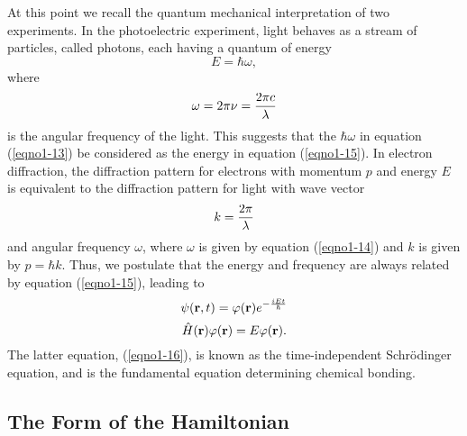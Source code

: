At this point we recall the quantum mechanical interpretation of two 
experiments. In the photoelectric experiment, light behaves as a stream 
of particles, called photons, each having a quantum of energy
\begin{equation}
E = \hbar \omega , 
\label{eqno1-15}
\end{equation}
where
\begin{equation}
\omega = 2 \pi \nu = {2 \pi c \over \lambda}
\end{equation}
is the angular frequency of the light. This suggests that the $\hbar
\omega$ in equation (\ref{eqno1-13}) be considered as the energy in
equation (\ref{eqno1-15}). In electron diffraction, the diffraction
pattern for electrons with momentum $p$ and energy $E$ is equivalent
to the diffraction pattern for light with wave vector
\begin{equation}
k = {2 \pi \over \lambda}
\end{equation}
and angular frequency $\omega$, where $\omega$ is given by equation
(\ref{eqno1-14}) and $k$ is given by $p = \hbar k$.  Thus, we postulate
that the energy and frequency are always related by equation
(\ref{eqno1-15}), leading to
\begin{equation}
\psi ( {\bf r} , t ) = \varphi ( {\bf r} ) e^{-{i E t \over \hbar}}
\end{equation}
\begin{equation}
{\hat H} ( {\bf r} ) \varphi ( {\bf r} ) = E \varphi ( {\bf r} ).
\label{eqno1-16}
\end{equation}
The latter equation, (\ref{eqno1-16}), is known as the
time-independent Schr\"odinger equation, and is the fundamental
equation determining chemical bonding.

\subsection{The Form of the Hamiltonian}

